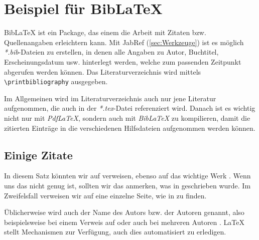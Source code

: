 \section{Beispiel für BibLaTeX}

BibLaTeX ist ein Package, das einem die Arbeit mit Zitaten bzw. Quellenangaben erleichtern kann. Mit JabRef (\autoref{sec:Werkzeuge}) ist es möglich
\textit{*.bib}-Dateien zu erstellen, in denen alle Angaben zu Autor, Buchtitel, Erscheinungsdatum usw. hinterlegt werden, welche zum passenden Zeitpunkt
abgerufen werden können. Das Literaturverzeichnis wird mittels \lstinline{\printbibliography} ausgegeben.

Im Allgemeinen wird im Literaturverzeichnis auch nur jene Literatur aufgenommen, die auch in der \textit{*.tex}-Datei referenziert wird. Danach ist es wichtig
nicht nur mit \textit{Pdf\-LaTeX}, sondern auch mit \textit{BibLaTeX} zu kompilieren, damit die zitierten Einträge in die verschiedenen Hilfsdateien aufgenommen
werden können. %


\subsection*{Einige Zitate}
In diesem Satz könnten wir auf \cite{knuth:1976} verweisen, ebenso auf das wichtige Werk \cite{dueck:trio}. Wenn uns das nicht genug ist, sollten wir das anmerken,
was in \cite{sommerville:1992} geschrieben wurde. Im Zweifelsfall verweisen wir auf eine einzelne Seite, wie in \cite[112]{bentley:1999} zu finden. 

Üblicherweise wird auch der Name des Autors bzw. der Autoren genannt, also beispielsweise bei einem Verweis auf \citeauthor{knuth:1976} \cite{knuth:1976} oder 
auch bei mehreren Autoren \citeauthor{cormen:2001} \cite{cormen:2001}. LaTeX stellt Mechanismen zur Verfügung, auch dies automatisiert zu erledigen.




